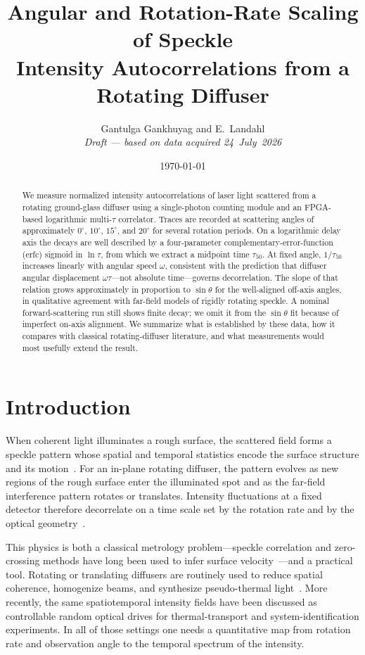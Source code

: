 \documentclass[11pt,letterpaper]{article}
\title{Angular and Rotation-Rate Scaling of Speckle\\
Intensity Autocorrelations from a Rotating Diffuser}
\author{Gantulga Gankhuyag and E.~Landahl\\[0.4em]
\large\textit{Draft --- based on data acquired 24~July~2026}}
\date{\today}
\begin{document}
\maketitle

\begin{abstract}
We measure normalized intensity autocorrelations of laser light scattered from a
rotating ground-glass diffuser using a single-photon counting module and an
FPGA-based logarithmic multi-$\tau$ correlator. Traces are recorded at scattering
angles of approximately $0^\circ$, $10^\circ$, $15^\circ$, and $20^\circ$ for several
rotation periods. On a logarithmic delay axis the decays are well described by a
four-parameter complementary-error-function (erfc) sigmoid in $\ln\tau$, from which
we extract a midpoint time $\tau_{50}$. At fixed angle, $1/\tau_{50}$ increases
linearly with angular speed $\omega$, consistent with the prediction that
diffuser angular displacement $\omega\tau$---not absolute time---governs
decorrelation. The slope of that relation grows approximately in proportion to
$\sin\theta$ for the well-aligned off-axis angles, in qualitative agreement with
far-field models of rigidly rotating speckle. A nominal forward-scattering run
still shows finite decay; we omit it from the $\sin\theta$ fit because of
imperfect on-axis alignment. We summarize what is established by
these data, how it compares with classical rotating-diffuser literature, and what
measurements would most usefully extend the result.
\end{abstract}

\section{Introduction}
\label{sec:intro}

When coherent light illuminates a rough surface, the scattered field forms a
speckle pattern whose spatial and temporal statistics encode the surface
structure and its motion~\cite{GoodmanSpeckle,GoodmanStatistical}. For an
in-plane rotating diffuser, the pattern evolves as new regions of the rough
surface enter the illuminated spot and as the far-field interference pattern
rotates or translates. Intensity fluctuations at a fixed detector therefore
decorrelate on a time scale set by the rotation rate and by the optical
geometry~\cite{Saleh1975,Churnside1982,Yoshimura1986,Yura1998}.

This physics is both a classical metrology problem---speckle correlation and
zero-crossing methods have long been used to infer surface
velocity~\cite{Saleh1975,Takai1980}---and a practical tool. Rotating or translating
diffusers are routinely used to reduce spatial coherence, homogenize beams, and
synthesize pseudo-thermal light~\cite{GoodmanSpeckle}. More recently, the same
spatiotemporal intensity fields have been discussed as controllable random
optical drives for thermal-transport and system-identification
experiments. In all of those settings one needs a quantitative map from
rotation rate and observation angle to the temporal spectrum of the intensity.
\end{document}

